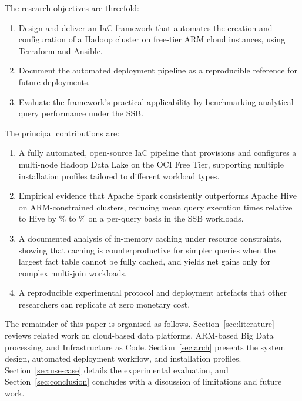 The research objectives are threefold:

\begin{enumerate}
    \item Design and deliver an IaC framework that automates the creation and
    configuration of a Hadoop cluster on free-tier ARM cloud instances, using Terraform
    and Ansible.
    \item Document the automated deployment pipeline as a reproducible reference for
    future deployments.
    \item Evaluate the framework's practical applicability by benchmarking analytical
    query performance under the SSB.
\end{enumerate}

The principal contributions are:

\begin{enumerate}
    \item A fully automated, open-source IaC pipeline that provisions and configures a
    multi-node Hadoop Data Lake on the OCI Free Tier, supporting multiple installation
    profiles tailored to different workload types.
    \item Empirical evidence that Apache Spark consistently outperforms Apache Hive on
    ARM-constrained clusters, reducing mean query execution times relative to Hive by
    \PaperHSRedPctMin\% to \PaperHSRedPctMax\% on a per-query basis in the SSB workloads.
    \item A documented analysis of in-memory caching under resource constraints,
    showing that caching is counterproductive for simpler queries when the largest fact
    table cannot be fully cached, and yields net gains only for complex multi-join
    workloads.
    \item A reproducible experimental protocol and deployment artefacts that other
    researchers can replicate at zero monetary cost.
\end{enumerate}

The remainder of this paper is organised as follows.
Section~\ref{sec:literature} reviews related work on cloud-based data platforms,
ARM-based Big Data processing, and Infrastructure as Code.
Section~\ref{sec:arch} presents the system design, automated deployment
workflow, and installation profiles. Section~\ref{sec:use-case} details the
experimental evaluation, and Section~\ref{sec:conclusion} concludes with a
discussion of limitations and future work.
